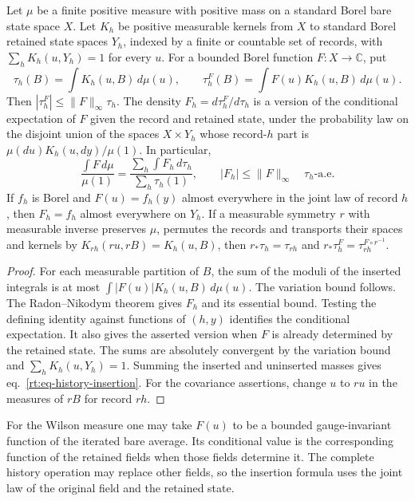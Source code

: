 \documentclass[11pt,letterpaper,reqno]{amsart}
\makeatletter
\numberwithin{equation}{section}
\renewcommand{\eqref}[1]{\textup{eq.~\ref{#1}}}
\theoremstyle{definition}
\newcommand{\ms@minorstart}{%
  \pushQED{\qed}\renewcommand{\qedsymbol}{$\blacksquare$}}
\newenvironment{lemma}[1][]{\ms@minorstart\ms@lemma[#1]}
  {\popQED\endms@lemma}
\theoremstyle{remark}
\makeatother
\begin{document}
\begin{lemma}[Bounded insertions and positive history kernels]
\label{rt:lem-history-insertion}
Let \(\mu\) be a finite positive measure with positive mass on
a standard Borel bare state space \(X\). Let \(K_h\) be positive measurable
kernels from \(X\) to standard Borel retained state spaces \(Y_h\),
indexed by a finite or countable set of records, with
\(\sum_h K_h(u,Y_h)=1\) for every \(u\). For a bounded Borel
function \(F:X\to\mathbb C\), put
\[
 \tau_h(B)=\int K_h(u,B)\,d\mu(u),\qquad
 \tau_h^F(B)=\int F(u)K_h(u,B)\,d\mu(u).
\]
Then \(|\tau_h^F|\le\|F\|_\infty\tau_h\). The density
\(F_h=d\tau_h^F/d\tau_h\) is a version of the conditional
expectation of \(F\) given the record and retained state, under
the probability law on the disjoint union of the spaces \(X\times Y_h\)
whose record-\(h\) part is \(\mu(du)K_h(u,dy)/\mu(1)\). In particular,
\begin{equation}\label{rt:eq-history-insertion}
  \frac{\int F\,d\mu}{\mu(1)}
    =\frac{\sum_h\int F_h\,d\tau_h}{\sum_h\tau_h(1)},
   \qquad |F_h|\le\|F\|_\infty\quad \tau_h\text{-a.e.}
\end{equation}
If \(f_h\) is Borel and \(F(u)=f_h(y)\) almost everywhere in the joint law of record
\(h\), then \(F_h=f_h\) almost everywhere on \(Y_h\).
If a measurable symmetry \(r\) with measurable inverse preserves \(\mu\), permutes the records
and transports their spaces and kernels by
\(K_{rh}(ru,rB)=K_h(u,B)\), then \(r_*\tau_h=\tau_{rh}\)
and \(r_*\tau_h^F=\tau_{rh}^{F\circ r^{-1}}\).
\end{lemma}
\begin{proof}
For each measurable partition of \(B\), the sum of the moduli
of the inserted integrals is at most
\(\int |F(u)|K_h(u,B)\,d\mu(u)\). The variation bound follows.
The Radon--Nikodym theorem gives \(F_h\) and its essential
bound. Testing the defining identity against functions of
\((h,y)\) identifies the conditional expectation. It also
gives the asserted version when \(F\) is already determined
by the retained state. The sums are absolutely convergent
by the variation bound and \(\sum_h K_h(u,Y_h)=1\). Summing
the inserted and uninserted masses gives
\eqref{rt:eq-history-insertion}. For the covariance assertions,
change \(u\) to \(ru\) in the measures of \(rB\) for record \(rh\).
\end{proof}

For the Wilson measure one may take \(F(u)\) to be a bounded
gauge-invariant function of the iterated bare average. Its
conditional value is the corresponding function of the
retained fields when those fields determine it. The complete
history operation may replace other fields, so the insertion
formula uses the joint law of the original field and the
retained state.
\end{document}

